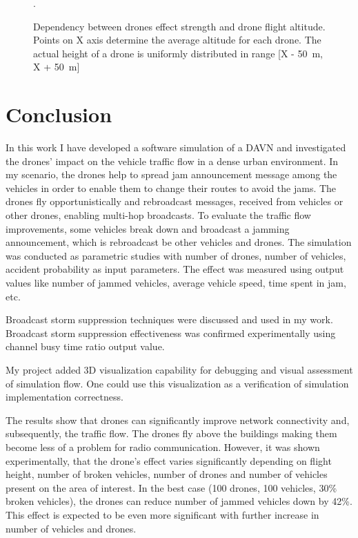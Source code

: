 \documentclass[]{nsm-thesis}
\begin{document}
\begin{figure}%
	\centering
	\hfill
	\hfill
	\caption{Dependency between drones effect strength and drone flight altitude. Points on X axis determine the average altitude for each drone. The actual height of a drone is uniformly distributed in range [X - \SI{50}{\meter}, X + \SI{50}{\meter}]}.%
	\label{fig:Evaluation-DroneHeight}%
\end{figure}


\chapter{Conclusion}

In this work I have developed a software simulation of a \ac{DAVN} and investigated the drones' impact on the vehicle traffic flow in a dense urban environment. In my scenario, the drones help to spread jam announcement message among the vehicles in order to enable them to change their routes to avoid the jams. The drones fly opportunistically and rebroadcast messages, received from vehicles or other drones, enabling multi-hop broadcasts. To evaluate the traffic flow improvements, some vehicles break down and broadcast a jamming announcement, which is rebroadcast be other vehicles and drones. The simulation was conducted as parametric studies with number of drones, number of vehicles, accident probability as input parameters. The effect was measured using output values like number of jammed vehicles, average vehicle speed, time spent in jam, etc.

Broadcast storm suppression techniques were discussed and used in my work. Broadcast storm suppression effectiveness was confirmed experimentally using channel busy time ratio output value.

My project added 3D visualization capability for debugging and visual assessment of simulation flow. One could use this visualization as a verification of simulation implementation correctness.

The results show that drones can significantly improve network connectivity and, subsequently, the traffic flow. The drones fly above the buildings making them become less of a problem for radio communication. However, it was shown experimentally, that the drone's effect varies significantly depending on flight height, number of broken vehicles, number of drones and number of vehicles present on the area of interest. In the best case (100 drones, 100 vehicles, 30\% broken vehicles), the drones can reduce number of jammed vehicles down by 42\%. This effect is expected to be even more significant with further increase in number of vehicles and drones.
\end{document}

